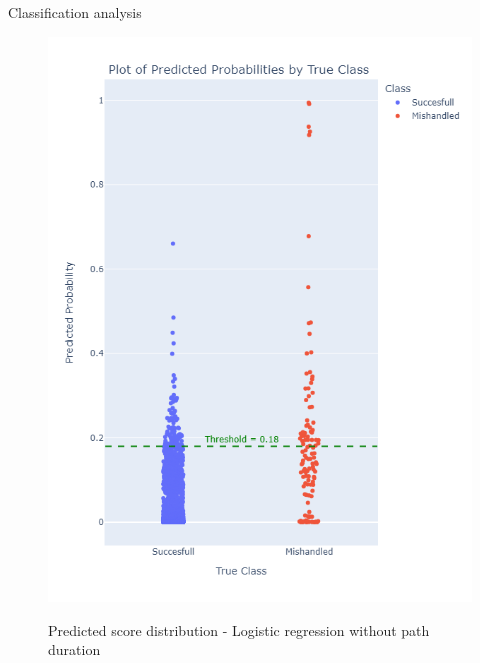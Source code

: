\documentclass{beamer}
\begin{document}
\begin{frame}{Classification analysis} 
\begin{figure}
\begin{minipage}[c]{0.4\linewidth}
    \includegraphics[width=1\textwidth]{Probability_distribution_Model 1.png}\\
    \caption{Predicted score distribution - Logistic regression without path duration}
\end{minipage}
\hfill
\begin{minipage}[c]{0.4\linewidth}

\end{minipage}
\end{figure}
\end{frame}
\end{document}

